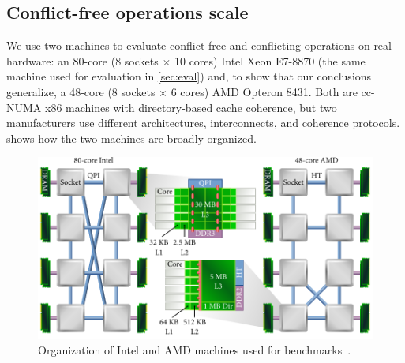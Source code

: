 

\subsection{Conflict-free operations scale}
\label{sec:scalability:conflict-free}

We use two machines to evaluate conflict-free and conflicting
operations on real hardware: an 80-core (8 sockets $\times$ 10 cores)
Intel Xeon E7-8870 (the same machine used for evaluation in
\cref{sec:eval}) and, to show that our conclusions generalize, a
48-core (8 sockets $\times$ 6 cores) AMD Opteron 8431.
%
Both are cc-NUMA x86 machines with directory-based cache coherence,
but two manufacturers use different architectures, interconnects, and
coherence protocols.
%
 shows how the
two machines are broadly organized.

\begin{figure}
  \centering
  \includegraphics[width=\textwidth]{figures/machines.pdf}
  \caption[Organization of benchmark machines.]{Organization of Intel
    and AMD machines used for
    benchmarks~\cite{ben-motherboard,tom-motherboard-1,tom-motherboard-2}.}
  \label{fig:machines}
\end{figure}


\begin{figure}
  \centering
  \label{fig:cfree-cycles}
\end{figure}

